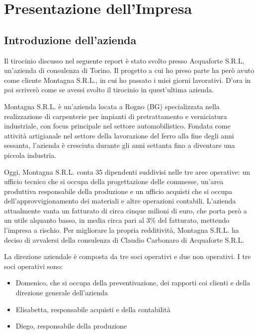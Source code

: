 \chapter{Presentazione dell'Impresa}

\section{Introduzione dell'azienda}
\begin{multicols}{2} Il tirocinio discusso nel seguente report è stato svolto presso Acquaforte S.R.L, un'azienda di consulenza di Torino. Il progetto a cui ho preso parte ha però avuto come cliente Montagna S.R.L., in cui ho passato i miei giorni lavorativi. D'ora in poi scriverò come se avessi svolto il tirocinio in quest'ultima azienda.

	Montagna S.R.L. è un’azienda locata a Rogno (BG) specializzata nella realizzazione di carpenterie per impianti di pretrattamento e verniciatura industriale, con focus principale nel settore automobilistico. Fondata come attività artigianale nel settore della lavorazione del ferro alla fine degli anni sessanta, l'azienda è cresciuta durante gli anni settanta fino a diventare una piccola industria.

	Oggi, Montagna S.R.L. conta 35 dipendenti suddivisi nelle tre aree operative: un ufficio tecnico che si occupa della progettazione delle commesse, un’area produttiva responsabile della produzione e un ufficio acquisti che si occupa dell’approvvigionamento dei materiali e altre operazioni contabili. L’azienda attualmente vanta un fatturato di circa cinque milioni di euro, che porta però a un utile alquanto basso, in media circa pari al 3\% del fatturato, mettendo l'impresa a rischio.
	Per migliorare la propria redditività, Montagna S.R.L. ha deciso di avvalersi della consulenza di Claudio Carbonaro di Acquaforte S.R.L.

	La direzione aziendale è composta da tre soci operativi e due non operativi. I tre soci operativi sono:
	\begin{itemize}
		\item Domenico, che si occupa della preventivazione, dei rapporti coi clienti e della direzione generale dell'azienda
		\item Elisabetta, responsabile acquisti e della contabilità
		\item Diego, responsabile della produzione
	\end{itemize}


\end{multicols}
